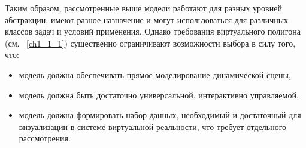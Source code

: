 Таким образом, рассмотренные выше модели работают для разных уровней абстракции, имеют разное назначение и могут использоваться для различных классов задач и условий применения. Однако требования виртуального полигона (см. ~\ref{ch1_1_1}) существенно ограничивают возможности выбора в силу того, что:
\begin{itemize}
	\item модель должна обеспечивать прямое моделирование динамической сцены,
	\item модель должна быть достаточно универсальной, интерактивно управляемой,
	\item модель должна формировать набор данных, необходимый и достаточный для визуализации в системе виртуальной реальности, что требует отдельного рассмотрения.
\end{itemize}
